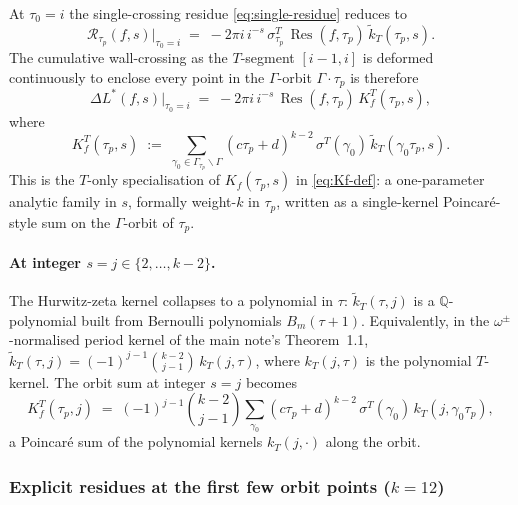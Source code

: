 \documentclass[11pt]{article}
\newcommand{\QQ}{\mathbb{Q}}
\DeclareMathOperator{\Res}{Res}
\begin{document}
At $\tau_0 = i$ the single-crossing residue \eqref{eq:single-residue}
reduces to
\begin{equation}\label{eq:single-residue-tau0-i}
  \mathcal{R}_{\tau_p}(f, s)\bigl|_{\tau_0 = i}
  \;=\; -2\pi i\,i^{-s}\,\sigma^T_{\tau_p}\,\Res(f, \tau_p)\,
  \widetilde{k}_T(\tau_p, s).
\end{equation}
The cumulative wall-crossing as the $T$-segment $[i - 1, i]$ is
deformed continuously to enclose every point in the $\Gamma$-orbit
$\Gamma\cdot\tau_p$ is therefore
\begin{equation}\label{eq:Kf-T-only}
  \Delta L^*(f, s)\bigl|_{\tau_0 = i}
  \;=\; -2\pi i\,i^{-s}\,\Res(f, \tau_p)\,
  K_f^T(\tau_p, s),
\end{equation}
where
\begin{equation}\label{eq:Kf-T-def}
  K_f^T(\tau_p, s)
  \;:=\; \!\sum_{\gamma_0 \in \Gamma_{\tau_p}\backslash\Gamma}\!
  (c\tau_p + d)^{k - 2}\,\sigma^T(\gamma_0)\,
  \widetilde{k}_T(\gamma_0\tau_p, s).
\end{equation}
This is the $T$-only specialisation of $K_f(\tau_p, s)$ in
\eqref{eq:Kf-def}: a one-parameter analytic family in $s$, formally
weight-$k$ in $\tau_p$, written as a single-kernel Poincar\'e-style
sum on the $\Gamma$-orbit of $\tau_p$.

\paragraph{At integer $s = j \in \{2, \ldots, k-2\}$.}
The Hurwitz-zeta kernel collapses to a polynomial in $\tau$:
$\widetilde{k}_T(\tau, j)$ is a $\QQ$-polynomial built from
Bernoulli polynomials $B_m(\tau + 1)$.  Equivalently, in the
$\omega^\pm$-normalised period kernel of the main note's Theorem~1.1,
$\widetilde{k}_T(\tau, j) = (-1)^{j-1}\binom{k - 2}{j - 1}\,
k_T(j, \tau)$, where $k_T(j, \tau)$ is the polynomial $T$-kernel.
The orbit sum at integer $s = j$ becomes
\begin{equation}\label{eq:Kf-T-integer}
  K_f^T(\tau_p, j)
  \;=\; (-1)^{j-1}\binom{k-2}{j-1}\!\sum_{\gamma_0}\!
  (c\tau_p + d)^{k - 2}\,\sigma^T(\gamma_0)\,k_T(j, \gamma_0\tau_p),
\end{equation}
a Poincar\'e sum of the polynomial kernels $k_T(j, \cdot)$ along the
orbit.

\subsubsection*{Explicit residues at the first few orbit points ($k = 12$)}
\end{document}
